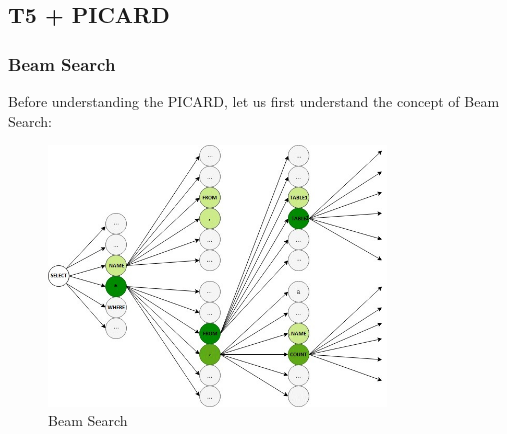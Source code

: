 \clearpage
\subsection{T5 + PICARD} \label{picard}




\subsubsection*{Beam Search}
Before understanding the PICARD, let us first understand the concept of Beam Search:

\begin{figure}[h]
    \centering
    \includegraphics[width=0.8\textwidth]{pics/picard/beam.png}
    \caption{Beam Search}
    \label{fig:beam_search}
\end{figure}

